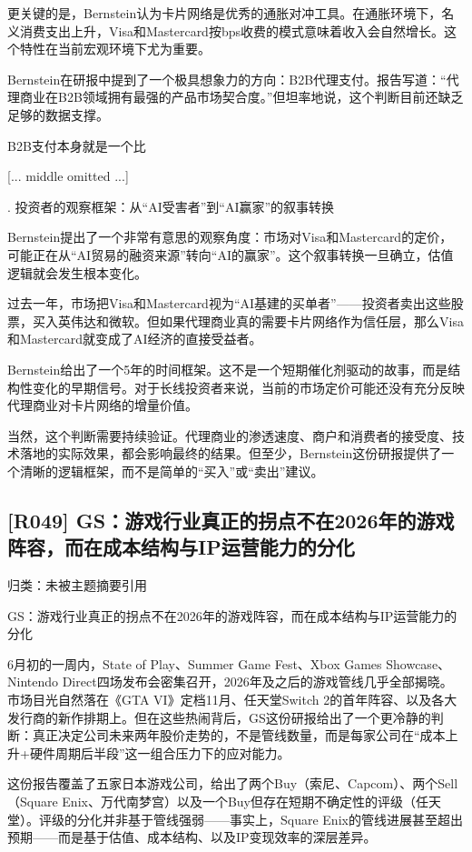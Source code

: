 \documentclass[11pt]{ctexart}
\begin{document}
更关键的是，Bernstein认为卡片网络是优秀的通胀对冲工具。在通胀环境下，名义消费支出上升，Visa和Mastercard按bps收费的模式意味着收入会自然增长。这个特性在当前宏观环境下尤为重要。

Bernstein在研报中提到了一个极具想象力的方向：B2B代理支付。报告写道：“代理商业在B2B领域拥有最强的产品市场契合度。”但坦率地说，这个判断目前还缺乏足够的数据支撑。

B2B支付本身就是一个比

[... middle omitted ...]

. 投资者的观察框架：从“AI受害者”到“AI赢家”的叙事转换

Bernstein提出了一个非常有意思的观察角度：市场对Visa和Mastercard的定价，可能正在从“AI贸易的融资来源”转向“AI的赢家”。这个叙事转换一旦确立，估值逻辑就会发生根本变化。

过去一年，市场把Visa和Mastercard视为“AI基建的买单者”——投资者卖出这些股票，买入英伟达和微软。但如果代理商业真的需要卡片网络作为信任层，那么Visa和Mastercard就变成了AI经济的直接受益者。

Bernstein给出了一个5年的时间框架。这不是一个短期催化剂驱动的故事，而是结构性变化的早期信号。对于长线投资者来说，当前的市场定价可能还没有充分反映代理商业对卡片网络的增量价值。

当然，这个判断需要持续验证。代理商业的渗透速度、商户和消费者的接受度、技术落地的实际效果，都会影响最终的结果。但至少，Bernstein这份研报提供了一个清晰的逻辑框架，而不是简单的“买入”或“卖出”建议。

\subsection{[R049] GS：游戏行业真正的拐点不在2026年的游戏阵容，而在成本结构与IP运营能力的分化}
{\small\color{refgray}归类：未被主题摘要引用}

GS：游戏行业真正的拐点不在2026年的游戏阵容，而在成本结构与IP运营能力的分化

6月初的一周内，State of Play、Summer Game Fest、Xbox Games Showcase、Nintendo Direct四场发布会密集召开，2026年及之后的游戏管线几乎全部揭晓。市场目光自然落在《GTA VI》定档11月、任天堂Switch 2的首年阵容、以及各大发行商的新作排期上。但在这些热闹背后，GS这份研报给出了一个更冷静的判断：真正决定公司未来两年股价走势的，不是管线数量，而是每家公司在“成本上升+硬件周期后半段”这一组合压力下的应对能力。

这份报告覆盖了五家日本游戏公司，给出了两个Buy（索尼、Capcom）、两个Sell（Square Enix、万代南梦宫）以及一个Buy但存在短期不确定性的评级（任天堂）。评级的分化并非基于管线强弱——事实上，Square Enix的管线进展甚至超出预期——而是基于估值、成本结构、以及IP变现效率的深层差异。
\end{document}
